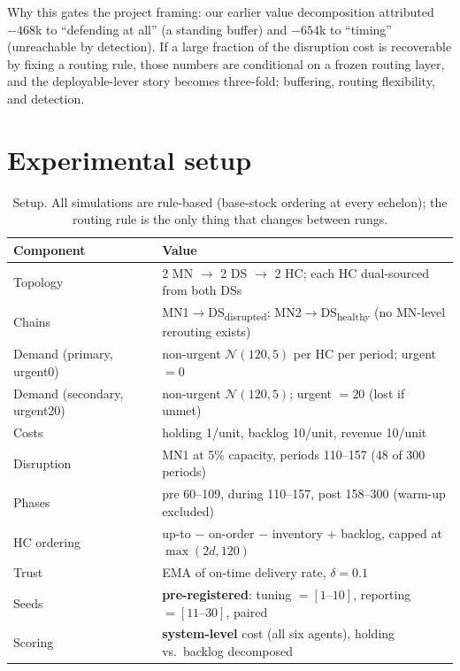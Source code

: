 \documentclass[11pt]{article}
\newcommand{\dsd}{DS\textsubscript{disrupted}}
\newcommand{\dsh}{DS\textsubscript{healthy}}
\begin{document}
Why this gates the project framing: our earlier value decomposition attributed $-468$k to
``defending at all'' (a standing buffer) and $-654$k to ``timing'' (unreachable by
detection). If a large fraction of the disruption cost is recoverable by fixing a routing
rule, those numbers are conditional on a frozen routing layer, and the deployable-lever story
becomes three-fold: buffering, routing flexibility, and detection.

\section{Experimental setup}

\begin{table}[h]
\centering\small
\caption{Setup. All simulations are rule-based (base-stock ordering at every echelon); the
routing rule is the only thing that changes between rungs.}
\begin{tabular}{ll}
\toprule
\textbf{Component} & \textbf{Value} \\
\midrule
Topology & 2 MN $\to$ 2 DS $\to$ 2 HC; each HC dual-sourced from both DSs \\
Chains & MN1$\to$\dsd{}; MN2$\to$\dsh{} (no MN-level rerouting exists) \\
Demand (primary, urgent0) & non-urgent $\mathcal{N}(120,5)$ per HC per period; urgent $=0$ \\
Demand (secondary, urgent20) & non-urgent $\mathcal{N}(120,5)$; urgent $=20$ (lost if unmet) \\
Costs & holding 1/unit, backlog 10/unit, revenue 10/unit \\
Disruption & MN1 at 5\% capacity, periods 110--157 (48 of 300 periods) \\
Phases & pre 60--109, during 110--157, post 158--300 (warm-up excluded) \\
HC ordering & up-to $-$ on-order $-$ inventory $+$ backlog, capped at $\max(2d,120)$ \\
Trust & EMA of on-time delivery rate, $\delta=0.1$ \\
Seeds & \textbf{pre-registered}: tuning $=[1\text{--}10]$, reporting $=[11\text{--}30]$, paired \\
Scoring & \textbf{system-level} cost (all six agents), holding vs.\ backlog decomposed \\
\bottomrule
\end{tabular}
\end{table}
\end{document}
